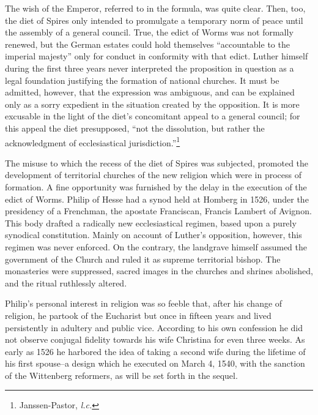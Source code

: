 The wish of the Emperor, referred to in the formula, was quite clear. Then,
too, the diet of Spires only intended to promulgate a temporary norm of peace
until the assembly of a general council. True, the edict of Worms was not
formally renewed, but the German estates could hold themselves “accountable
to the imperial majesty” only for conduct in conformity with that edict.
Luther himself during the first three years never interpreted the proposition
in question as a legal foundation justifying the formation of national
churches. It must be admitted, however, that the expression was ambiguous,
and can be explained only as a sorry expedient in the situation created by
the opposition. It is more excusable in the light of the diet’s concomitant
appeal to a general council; for this appeal the diet presupposed, “not the
dissolution, but rather the acknowledgment of ecclesiastical jurisdiction.”\footnote{Janssen-Pastor, \textit{l.c.}}


The misuse to which the recess of the diet of Spires was subjected,
promoted the development of territorial churches of the new religion
which were in process of formation. A fine opportunity was furnished
by the delay in the execution of the edict of Worms. Philip
of Hesse had a synod held at Homberg in 1526, under the presidency
of a Frenchman, the apostate Franciscan, Francis Lambert of Avignon.
This body drafted a radically new ecclesiastical regimen, based upon a
purely synodical constitution. Mainly on account of Luther’s opposition,
however, this regimen was never enforced. On the contrary, the
landgrave himself assumed the government of the Church and ruled
it as supreme territorial bishop. The monasteries were suppressed,
sacred images in the churches and shrines abolished, and the ritual
ruthlessly altered.

Philip’s personal interest in religion was so feeble that, after his
change of religion, he partook of the Eucharist but once in fifteen
years and lived persistently in adultery and public vice. According
to his own confession he did not observe conjugal fidelity towards
his wife Christina for even three weeks. As early as 1526 he harbored
the idea of taking a second wife during the lifetime of his
first spouse--a design which he executed on March 4, 1540, with
the sanction of the Wittenberg reformers, as will be set forth in the
sequel.
